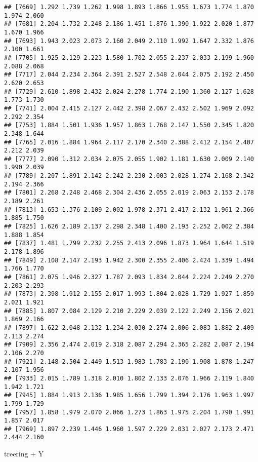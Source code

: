 \documentclass[
]{article}
\newenvironment{Shaded}{\begin{snugshade}}{\end{snugshade}}
\newcommand{\NormalTok}[1]{#1}
\newcommand{\SpecialCharTok}[1]{\textcolor[rgb]{0.00,0.00,0.00}{#1}}
\begin{document}
\begin{verbatim}
## [7669] 1.292 1.739 1.262 1.998 1.893 1.866 1.955 1.673 1.774 1.870 1.974 2.060
## [7681] 2.204 1.732 2.248 2.186 1.451 1.876 1.390 1.922 2.020 1.877 1.670 1.966
## [7693] 1.943 2.023 2.073 2.160 2.049 2.110 1.992 1.647 2.332 1.876 2.100 1.661
## [7705] 1.925 2.129 2.223 1.580 1.702 2.055 2.237 2.033 2.199 1.960 2.088 2.068
## [7717] 2.044 2.234 2.364 2.391 2.527 2.548 2.044 2.075 2.192 2.450 2.620 2.653
## [7729] 2.610 1.898 2.432 2.024 2.278 1.774 2.190 1.360 2.127 1.628 1.773 1.730
## [7741] 2.004 2.415 2.127 2.442 2.398 2.067 2.432 2.502 1.969 2.092 2.292 2.354
## [7753] 1.884 1.501 1.936 1.957 1.863 1.768 2.147 1.550 2.345 1.820 2.348 1.644
## [7765] 2.016 1.884 1.964 2.117 2.170 2.340 2.388 2.412 2.154 2.407 2.212 2.039
## [7777] 2.090 1.312 2.034 2.075 2.055 1.902 1.181 1.630 2.009 2.140 1.990 2.039
## [7789] 2.207 1.891 2.142 2.242 2.230 2.003 2.028 1.274 2.168 2.342 2.194 2.366
## [7801] 2.268 2.248 2.468 2.304 2.436 2.055 2.019 2.063 2.153 2.178 2.189 2.261
## [7813] 1.653 1.376 2.109 2.002 1.978 2.371 2.417 2.132 1.961 2.366 1.885 1.750
## [7825] 1.626 2.189 2.137 2.298 2.348 1.400 2.193 2.252 2.002 2.384 1.888 1.854
## [7837] 1.481 1.799 2.232 2.255 2.413 2.096 1.873 1.964 1.644 1.519 2.178 1.896
## [7849] 2.108 2.147 2.193 1.942 2.300 2.355 2.406 2.424 1.339 1.494 1.766 1.770
## [7861] 2.075 1.946 2.327 1.787 2.093 1.834 2.044 2.224 2.249 2.270 2.203 2.293
## [7873] 2.398 1.912 2.155 2.017 1.993 1.804 2.028 1.729 1.927 1.859 2.021 1.921
## [7885] 1.807 2.084 2.129 2.210 2.229 2.039 2.122 2.249 2.156 2.021 1.869 2.166
## [7897] 1.622 2.048 2.132 1.234 2.030 2.274 2.006 2.083 1.882 2.409 2.113 2.274
## [7909] 2.356 2.474 2.019 2.318 2.087 2.294 2.365 2.282 2.087 2.194 2.106 2.270
## [7921] 2.148 2.504 2.449 1.513 1.983 1.783 2.190 1.908 1.878 1.247 2.107 1.956
## [7933] 2.015 1.789 1.318 2.010 1.802 2.133 2.076 1.966 2.119 1.840 1.942 1.721
## [7945] 1.884 1.913 2.136 1.985 1.656 1.799 1.394 2.176 1.963 1.997 1.799 1.729
## [7957] 1.858 1.979 2.070 2.066 1.273 1.863 1.975 2.204 1.790 1.991 1.857 2.017
## [7969] 1.897 2.239 1.446 1.960 1.597 2.229 2.031 2.027 2.173 2.471 2.444 2.160
\end{verbatim}

\begin{Shaded}
\begin{Highlighting}[]
\NormalTok{treering }\SpecialCharTok{+}\NormalTok{ Y}
\end{Highlighting}
\end{Shaded}
\end{document}
